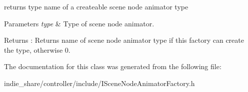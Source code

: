 returns type name of a createable scene node animator type 


\begin{DoxyParams}{Parameters}
{\em type} & Type of scene node animator. \\
\hline
\end{DoxyParams}
\begin{DoxyReturn}{Returns}
\+: Returns name of scene node animator type if this factory can create the type, otherwise 0. 
\end{DoxyReturn}


The documentation for this class was generated from the following file\+:\begin{DoxyCompactItemize}
\item 
indie\+\_\+share/controller/include/I\+Scene\+Node\+Animator\+Factory.\+h\end{DoxyCompactItemize}
